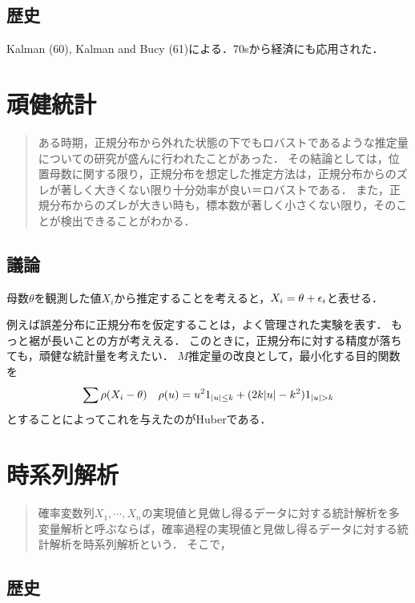 \documentclass[uplatex,dvipdfmx]{jsreport}
\begin{document}
\section{歴史}

\begin{history}
    Kalman (60), Kalman and Bucy (61)による．70sから経済にも応用された．
\end{history}

\chapter{頑健統計}

\begin{quotation}
    ある時期，正規分布から外れた状態の下でもロバストであるような推定量についての研究が盛んに行われたことがあった．
    その結論としては，位置母数に関する限り，正規分布を想定した推定方法は，正規分布からのズレが著しく大きくない限り十分効率が良い＝ロバストである．
    また，正規分布からのズレが大きい時も，標本数が著しく小さくない限り，そのことが検出できることがわかる．
\end{quotation}

\section{議論}

母数$\theta$を観測した値$X_i$から推定することを考えると，$X_i=\theta+\epsilon_i$と表せる．


例えば誤差分布に正規分布を仮定することは，よく管理された実験を表す．
もっと裾が長いことの方が考ええる．
このときに，正規分布に対する精度が落ちても，頑健な統計量を考えたい．
$M$推定量の改良として，最小化する目的関数を
\[\sum\rho(X_i-\theta)\quad\rho(u)=u^21_{\lvert u\rvert\le k}+(2k\lvert u\rvert-k^2)1_{\lvert u\rvert>k}\]
とすることによってこれを与えたのがHuberである．

\chapter{時系列解析}

\begin{quotation}
    確率変数列$X_1,\cdots,X_n$の実現値と見做し得るデータに対する統計解析を多変量解析と呼ぶならば，確率過程の実現値と見做し得るデータに対する統計解析を時系列解析という．
    そこで，
\end{quotation}

\section{歴史}
\end{document}
